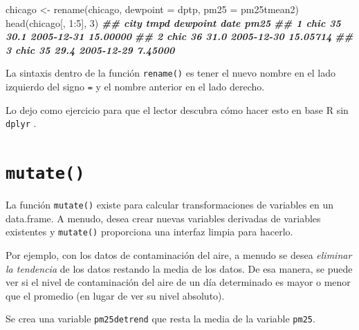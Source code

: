 \documentclass[
]{book}
\newenvironment{Shaded}{\begin{snugshade}}{\end{snugshade}}
\newcommand{\AttributeTok}[1]{\textcolor[rgb]{0.77,0.63,0.00}{#1}}
\newcommand{\DecValTok}[1]{\textcolor[rgb]{0.00,0.00,0.81}{#1}}
\newcommand{\DocumentationTok}[1]{\textcolor[rgb]{0.56,0.35,0.01}{\textbf{\textit{#1}}}}
\newcommand{\FunctionTok}[1]{\textcolor[rgb]{0.00,0.00,0.00}{#1}}
\newcommand{\NormalTok}[1]{#1}
\newcommand{\OtherTok}[1]{\textcolor[rgb]{0.56,0.35,0.01}{#1}}
\newcommand{\SpecialCharTok}[1]{\textcolor[rgb]{0.00,0.00,0.00}{#1}}
\begin{document}
\begin{Shaded}
\begin{Highlighting}[]
\NormalTok{chicago }\OtherTok{\textless{}{-}} \FunctionTok{rename}\NormalTok{(chicago, }\AttributeTok{dewpoint =}\NormalTok{ dptp,}
                  \AttributeTok{pm25 =}\NormalTok{ pm25tmean2)}
\FunctionTok{head}\NormalTok{(chicago[, }\DecValTok{1}\SpecialCharTok{:}\DecValTok{5}\NormalTok{], }\DecValTok{3}\NormalTok{)}
\DocumentationTok{\#\#   city tmpd dewpoint       date     pm25}
\DocumentationTok{\#\# 1 chic   35     30.1 2005{-}12{-}31 15.00000}
\DocumentationTok{\#\# 2 chic   36     31.0 2005{-}12{-}30 15.05714}
\DocumentationTok{\#\# 3 chic   35     29.4 2005{-}12{-}29  7.45000}
\end{Highlighting}
\end{Shaded}

La sintaxis dentro de la función \texttt{rename()} es tener el nuevo nombre en el lado izquierdo del signo \texttt{=} y el nombre anterior en el lado derecho.

Lo dejo como ejercicio para que el lector descubra cómo hacer esto en base R sin \texttt{dplyr} .

\hypertarget{mutate}{%
\section{\texorpdfstring{\texttt{mutate()}}{mutate()}}\label{mutate}}

La función \texttt{mutate()} existe para calcular transformaciones de variables en un data.frame. A menudo, desea crear nuevas variables derivadas de variables existentes y \texttt{mutate()} proporciona una interfaz limpia para hacerlo.

Por ejemplo, con los datos de contaminación del aire, a menudo se desea \emph{eliminar la tendencia} de los datos restando la media de los datos. De esa manera, se puede ver si el nivel de contaminación del aire de un día determinado es mayor o menor que el promedio (en lugar de ver su nivel absoluto).

Se crea una variable \texttt{pm25detrend} que resta la media de la variable \texttt{pm25}.
\end{document}
